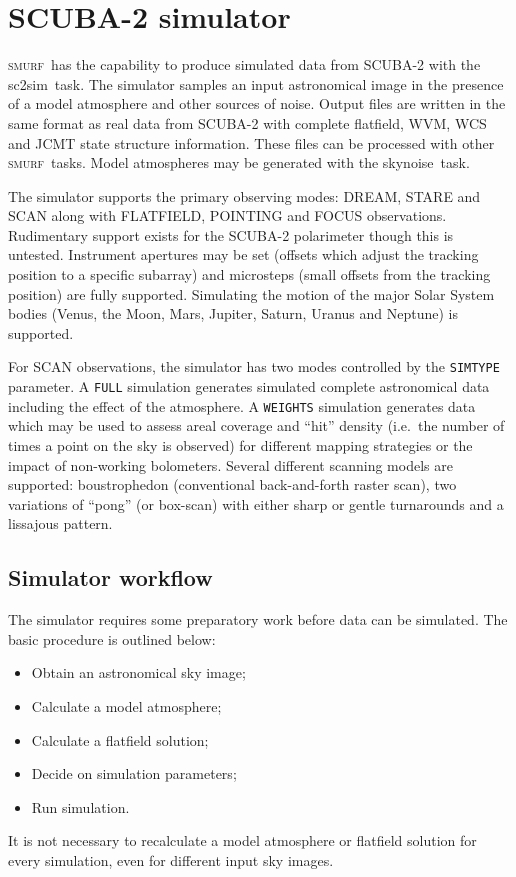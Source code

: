 \documentclass[twoside,11pt]{article}
\newcommand{\xref}[3]{#1}
\newcommand{\xlabel}[1]{}
\renewcommand{\_}{\texttt{\symbol{95}}}
\newcommand{\SMURF}{\textsc{smurf}}
\newcommand{\task}[1]{\textsf{#1}}
\newcommand{\sctwosim}{\xref{\task{sc2sim}}{sun258}{SC2SIM}}
\newcommand{\skynoise}{\xref{\task{skynoise}}{sun258}{SKYNOISE}}
\begin{document}
\section{\xlabel{simulator}SCUBA-2 simulator\label{se:sc2sim}}

\SMURF\ has the capability to produce simulated data from SCUBA-2 with
the \sctwosim\ task. The simulator samples an input astronomical image
in the presence of a model atmosphere and other sources of noise.
Output files are written in the same format as real data from SCUBA-2
with complete flatfield, WVM, WCS and JCMT state structure
information. These files can be processed with other \SMURF\
tasks. Model atmospheres may be generated with the \skynoise\ task.

The simulator supports the primary observing modes: DREAM, STARE and
SCAN along with FLATFIELD, POINTING and FOCUS
observations. Rudimentary support exists for the SCUBA-2 polarimeter
though this is untested. Instrument apertures may be set (offsets
which adjust the tracking position to a specific subarray) and
microsteps (small offsets from the tracking position) are fully
supported. Simulating the motion of the major Solar System bodies
(Venus, the Moon, Mars, Jupiter, Saturn, Uranus and Neptune) is
supported.

For SCAN observations, the simulator has two modes controlled by the
\texttt{SIMTYPE} parameter. A \texttt{FULL} simulation generates
simulated complete astronomical data including the effect of the
atmosphere. A \texttt{WEIGHTS} simulation generates data which may be
used to assess areal coverage and ``hit'' density (i.e.\ the number of
times a point on the sky is observed) for different mapping strategies
or the impact of non-working bolometers. Several different scanning
models are supported: boustrophedon (conventional back-and-forth
raster scan), two variations of ``pong'' (or box-scan) with either
sharp or gentle turnarounds and a lissajous pattern.

\subsection{\xlabel{simuse}Simulator workflow\label{se:simuse}}

The simulator requires some preparatory work before data can be
simulated. The basic procedure is outlined below:
\begin{itemize}
\item Obtain an astronomical sky image;
\item Calculate a model atmosphere;
\item Calculate a flatfield solution;
\item Decide on simulation parameters;
\item Run simulation.
\end{itemize}
It is not necessary to recalculate a model atmosphere or flatfield
solution for every simulation, even for different input sky images. 
\end{document}
